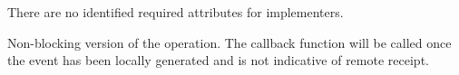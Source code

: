 \reqattrstart
There are no identified required attributes for implementers.

\reqattrend

\descr

Non-blocking version of the  operation. The callback function will be called once the event has been locally generated and is not indicative of remote receipt.


